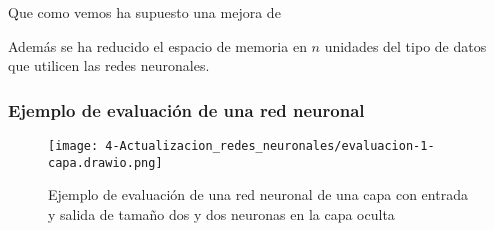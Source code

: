 Que como vemos ha supuesto una mejora de 

\begin{table}[h]
    \centering
    \caption{Comparativas de coste computacional entre la implementación usual de una red neuronal y la nuestra}
    \label{tab:comparativas coste red neuronal }
\end{table}

Además se ha reducido el espacio de memoria en $n$ unidades del tipo de datos que utilicen las redes neuronales. 

\subsubsection*{Ejemplo de evaluación de una red neuronal}

\begin{figure}[h!]
    \texttt{[image: 4-Actualizacion\_redes\_neuronales/evaluacion-1-capa.drawio.png]}
    \centering
    \caption{Ejemplo de evaluación de una red neuronal de una capa con entrada y salida de tamaño dos y dos neuronas en la capa oculta}
    \label{img:Ejemplo-evaluación-red-neruonal-una-capa}
\end{figure}

